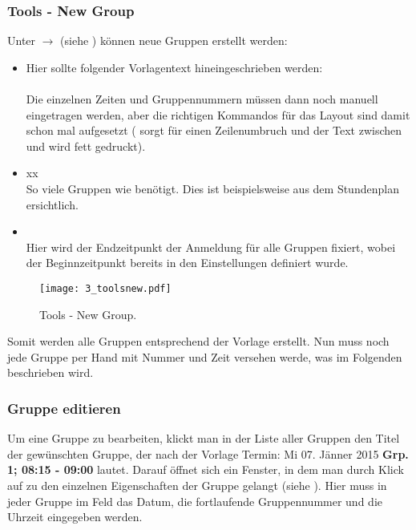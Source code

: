 \subsubsection{Tools - New Group}

Unter  $\to$  
(siehe ) können neue Gruppen erstellt werden:
\begin{itemize}
\item {} 
  Hier sollte folgender Vorlagentext hineingeschrieben werden:\\
  \\
  Die einzelnen Zeiten und Gruppennummern müssen dann noch manuell eingetragen
  werden, aber die richtigen Kommandos für das Layout sind damit schon mal
  aufgesetzt ( sorgt für einen Zeilenumbruch und der Text
  zwischen  und  wird fett 
  gedruckt).
\item {} xx\\
  So viele Gruppen wie benötigt. Dies ist beispielsweise aus dem Stundenplan 
  ersichtlich.
\item {}\\
  Hier wird der Endzeitpunkt der Anmeldung für alle Gruppen fixiert, wobei der
  Beginnzeitpunkt bereits in den Einstellungen definiert wurde.  
\end{itemize}

\begin{figure}[htbp]
  \begin{center}
  \texttt{[image: 3\_toolsnew.pdf]}
  \caption{ Tools - New Group.}
  \label{fig:toolsnew}
  \end{center}
\end{figure}

Somit werden alle Gruppen entsprechend der Vorlage erstellt. Nun muss noch jede
Gruppe per Hand mit Nummer und Zeit versehen werde, was im Folgenden beschrieben
wird.

\subsubsection{Gruppe editieren}

Um eine Gruppe zu bearbeiten, klickt man in der Liste aller Gruppen den Titel
der gewünschten Gruppe, der nach der Vorlage 
\glqq{}Termin: Mi 07. Jänner 2015 {\bf Grp. 1; 08:15 - 09:00}\grqq{} lautet.
Darauf öffnet sich ein Fenster, in dem man durch Klick auf 
zu den einzelnen Eigenschaften der Gruppe gelangt (siehe 
). Hier muss in jeder Gruppe im Feld  das
Datum, die fortlaufende Gruppennummer und die Uhrzeit eingegeben werden.

